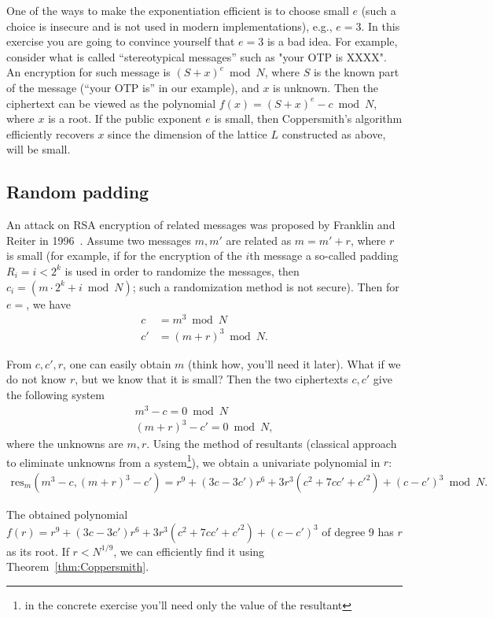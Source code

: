 \documentclass[11pt]{exam}
\theoremstyle{definition}
\begin{document}
One of the ways to make the exponentiation efficient is to choose small $e$ (such a choice is insecure and is not used in modern implementations), e.g., $e=3$. In this exercise you are going to convince yourself that $e=3$ is a bad idea.
For example, consider what is called ``stereotypical messages'' such as "your OTP is XXXX". An encryption for such message is  $(S+x)^e \bmod N$, where $S$ is the known part of the message (``your OTP is'' in our example), and $x$ is unknown. Then the ciphertext can be viewed as the polynomial $f(x) = (S+x)^e - c \bmod N$, where $x$ is a root. If the public exponent $e$ is small, then Coppersmith's algorithm efficiently recovers $x$ since the dimension of the lattice $L$ constructed as above, will be small.


\subsection{Random padding}

An attack on RSA encryption of related messages was proposed by Franklin and Reiter in 1996~\cite{FR96}. Assume two messages $m,m'$ are related as  $m = m'+r$, where $r$ is small (for example, if for the encryption of the $i$th message a so-called padding $R_i = i < 2^k$ is used in order to randomize the messages, then $c_i = (m\cdot 2^k + i \bmod N)$; such a randomization method is not secure). Then for $e=$, we have 
	\begin{align*}
			c &= m^3 \bmod N \\
			c' &=(m+r)^3 \bmod N.
	\end{align*}

From $c, c', r$, one can easily obtain $m$ (think how, you'll need it later). What if we do not know $r$, but we know that it is small? Then the two ciphertexts $c, c'$ give the following system 
	\begin{align*}
		m^3 - c = 0 \bmod N \\
		(m+r)^3 - c' = 0\bmod N,
	\end{align*}
where the unknowns are $m,r$. Using the method of resultants (classical approach to eliminate unknowns from a system\footnote{in the concrete exercise you'll need only the value of the resultant}), we obtain a univariate polynomial in $r$:
	\begin{align*}
			\text{res}_m(m^3 - c, (m+r)^3 - c' ) = r^9 + (3c - 3c')r^6 + 3r^3(c^2 + 7cc'+c'^2) + (c-c')^3 \bmod N.
	\end{align*}

The obtained polynomial $f(r)=r^9 + (3c - 3c')r^6 + 3r^3(c^2 + 7cc'+c'^2) + (c-c')^3 $  of degree 9 has $r$ as its root. If $r < N^{1/9}$, we can efficiently find it using Theorem~\ref{thm:Coppersmith}.
\end{document}
